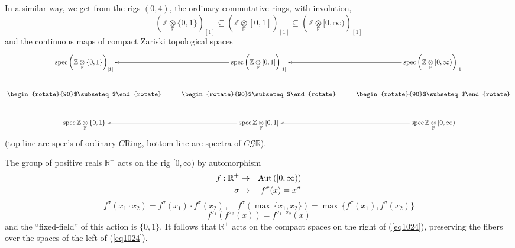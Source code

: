 \documentclass[leqno]{article}
\numberwithin{equation}{section}
\begin{document}
In a similar way, we get from the rigs $(0,4)$, the ordinary commutative rings, with involution,
\begin{equation}
\label{eq1023}
\left( {\mathbb Z} \underset{\mathbb F}{\otimes} \{0,1\}\right)_{[1]} \subseteq \left( {\mathbb Z} \underset{\mathbb F}{\otimes} [0,1] \right)_{[1]} \subseteq \left( {\mathbb Z} \underset{\mathbb F}{\otimes} [0,\infty) \right)_{[1]} 
\end{equation}
and the continuous maps of compact Zariski topological spaces
\begin{equation}
\label{eq1024}
\xymatrix{
{\rm spec} \left( {\mathbb Z} \underset{\mathbb F}{\otimes} \{ 0,1 \} \right)_{[1]} &{\rm spec} \left( {\mathbb Z} \underset{\mathbb F}{\otimes} [ 0,1 ] \right)_{[1]} \ar[l] &{\rm spec} \left( {\mathbb Z} \underset{\mathbb F}{\otimes} [ 0,\infty ) \right)_{[1]} \ar[l] \\
\mbox{\begin{rotate}{90}$\subseteq$\end{rotate}} &\mbox{\begin{rotate}{90}$\subseteq$\end{rotate}} &\mbox{\begin{rotate}{90}$\subseteq$\end{rotate}} \\
{\rm spec} \, {\mathbb Z} \underset{\mathbb F}{\otimes} \{0,1\} &{\rm spec} \, {\mathbb Z} \underset{\mathbb F}{\otimes} [0,1] \ar[l] &{\rm spec} \, {\mathbb Z} \underset{\mathbb F}{\otimes} [0,\infty) \ar[l]
}
\end{equation}
(top line are spec's of ordinary $C$Ring, bottom line are spectra of $C{\mathcal G}{\mathbb R}$).

\smallskip

The group of positive reals ${\mathbb R}^+$ acts on the rig $[0,\infty)$ by automorphism
\begin{eqnarray}
\label{eq1025}
f : {\mathbb R}^+ &\to &{\rm Aut} \, ([0,\infty)) \\
\sigma &\mapsto &f^{\sigma} (x) = x^{\sigma} \nonumber
\end{eqnarray}
$$
f^{\sigma} (x_1 \cdot x_2) = f^{\sigma} (x_1) \cdot f^{\sigma} (x_2) \, , \quad f^{\sigma} (\max \, \{x_1 , x_2\}) = \max \, \{ f^{\sigma} (x_1) , f^{\sigma} (x_2)\}
$$
$$
f^{\sigma_1} (f^{\sigma_2} (x)) = f^{\sigma_1 \cdot \sigma_2} (x)
$$
and the ``fixed-field'' of this action is $\{0,1\}$. It follows that ${\mathbb R}^+$ acts on the compact spaces on the right of (\ref{eq1024}), preserving the fibers over the spaces of the left of (\ref{eq1024}).
\end{document}
